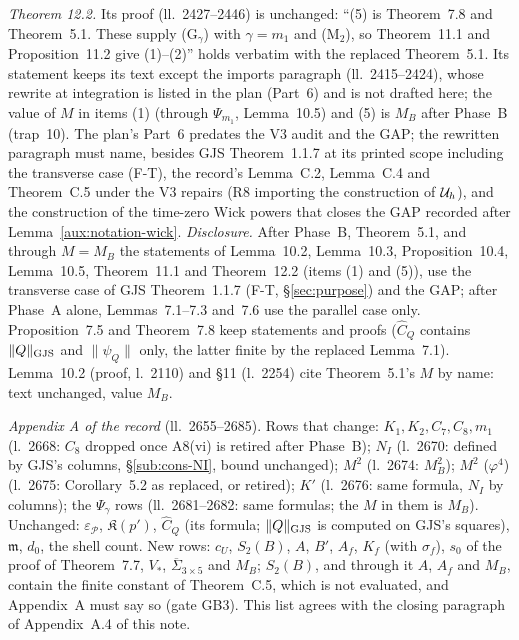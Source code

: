 \emph{Theorem 12.2.}  Its proof (ll.~2427--2446) is unchanged: ``(5) is Theorem~7.8 and
Theorem~5.1. These supply (G$_\gamma$) with $\gamma=m_1$ and (M$_2$), so Theorem~11.1 and
Proposition~11.2 give (1)--(2)'' holds verbatim with the replaced Theorem~5.1.  Its statement
keeps its text except the imports paragraph (ll.~2415--2424), whose rewrite at integration is
listed in the plan (Part~6) and is not drafted here; the value of $M$ in items (1) (through
$\Psi_{m_1}$, Lemma~10.5) and (5) is $M_B$ after Phase~B (trap~10).  The plan's Part~6 predates
the V3 audit and the GAP; the rewritten paragraph must name, besides GJS Theorem~1.1.7 at its
printed scope including the transverse case (F-T), the record's Lemma~C.2, Lemma~C.4 and
Theorem~C.5 under the V3 repairs (R8 importing the construction of $\mathcal U_h$), and the construction
of the time-zero Wick powers that closes the GAP recorded after Lemma~\ref{aux:notation-wick}.
\emph{Disclosure.}  After Phase~B, Theorem~5.1, and through $M=M_B$ the statements of Lemma~10.2,
Lemma~10.3, Proposition~10.4, Lemma~10.5, Theorem~11.1 and Theorem~12.2 (items (1) and (5)),
use the transverse case of GJS Theorem~1.1.7 (F-T, \S\ref{sec:purpose}) and the GAP; after
Phase~A alone, Lemmas~7.1--7.3 and~7.6 use the parallel case only.  Proposition~7.5 and
Theorem~7.8 keep statements and proofs ($\widehat C_Q$ contains $\lVert Q\rVert_{\mathrm{GJS}}$ and $\|\psi_Q\|$ only,
the latter finite by the replaced Lemma~7.1).  Lemma~10.2 (proof, l.~2110) and \S11 (l.~2254)
cite Theorem~5.1's $M$ by name: text unchanged, value $M_B$.

\emph{Appendix A of the record} (ll.~2655--2685).  Rows that change: $K_1,K_2,C_7,C_8,m_1$ (l.~2668:
$C_8$ dropped once A8(vi) is retired after Phase~B); $N_I$ (l.~2670: defined by GJS's columns,
\S\ref{sub:cons-NI}, bound unchanged); $M^2$ (l.~2674: $M_B^2$); $M^2$ ($\varphi^4$) (l.~2675:
Corollary~5.2 as replaced, or retired); $K'$ (l.~2676: same formula, $N_I$ by columns); the
$\Psi_\gamma$ rows (ll.~2681--2682: same formulas; the $M$ in them is $M_B$).  Unchanged:
$\varepsilon_{\mathscr P}$, $\mathfrak K(p')$, $\widehat C_Q$ (its formula; $\lVert Q\rVert_{\mathrm{GJS}}$ is computed on
GJS's squares), $\mathfrak m$, $d_0$, the shell count.  New rows: $c_U$, $S_2(B)$, $A$, $B'$,
$A_f$, $K_f$ (with $\sigma_f$), $s_0$ of the proof of Theorem~7.7, $V_*$,
$\overline\Sigma_{3\times5}$ and $M_B$; $S_2(B)$, and through it $A$, $A_f$ and $M_B$, contain the
finite constant of Theorem~C.5, which is not evaluated, and Appendix~A must say so (gate GB3).
This list agrees with the closing paragraph of Appendix~A.4 of this note.

